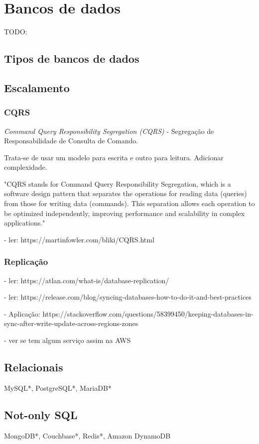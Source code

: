 \section{Bancos de dados}
TODO:

\subsection{Tipos de bancos de dados}


\subsection{Escalamento}

\subsubsection{CQRS}
\emph{Command Query Responsibility Segregation (CQRS)} - Segregação de Responsabilidade de Consulta de Comando. 

Trata-se de usar um modelo para escrita e outro para leitura. Adicionar complexidade. 

"CQRS stands for Command Query Responsibility Segregation, which is a software design pattern that separates the operations for reading data (queries) from those for writing data (commands). This separation allows each operation to be optimized independently, improving performance and scalability in complex applications."


- ler: https://martinfowler.com/bliki/CQRS.html


\subsubsection{Replicação}
- ler: https://atlan.com/what-is/database-replication/

- ler: https://release.com/blog/syncing-databases-how-to-do-it-and-best-practices

- Aplicação: https://stackoverflow.com/questions/58399450/keeping-databases-in-sync-after-write-update-across-regions-zones

- ver se tem algum serviço assim na AWS

\subsection{Relacionais}
MySQL*, PostgreSQL*, MariaDB*

\subsection{Not-only SQL}
MongoDB*, Couchbase*, Redis*, Amazon DynamoDB

